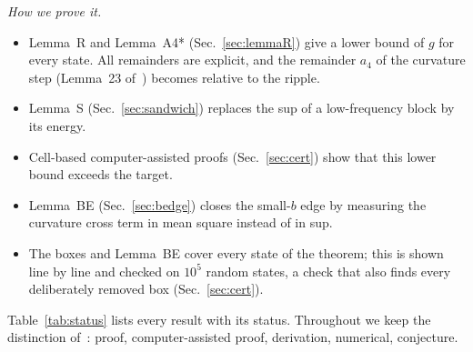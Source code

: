 \emph{How we prove it.}
\begin{itemize}
\item Lemma~R and Lemma~A4* (Sec.~\ref{sec:lemmaR}) give a lower bound of $g$ for every state.
  All remainders are explicit, and the remainder $a_4$ of the curvature step (Lemma~23 of~\cite{F}) becomes relative to the ripple.
\item Lemma~S (Sec.~\ref{sec:sandwich}) replaces the sup of a low-frequency block by its energy.
\item Cell-based computer-assisted proofs (Sec.~\ref{sec:cert}) show that this lower bound exceeds the target.
\item Lemma~BE (Sec.~\ref{sec:bedge}) closes the small-$b$ edge by measuring the curvature cross term in mean square instead of in sup.
\item The boxes and Lemma~BE cover every state of the theorem; this is shown line by line and checked on $10^5$ random states, a check that also finds every deliberately removed box (Sec.~\ref{sec:cert}).
\end{itemize}
Table~\ref{tab:status} lists every result with its status.
Throughout we keep the distinction of~\cite{F}: proof, computer-assisted proof, derivation, numerical, conjecture.

